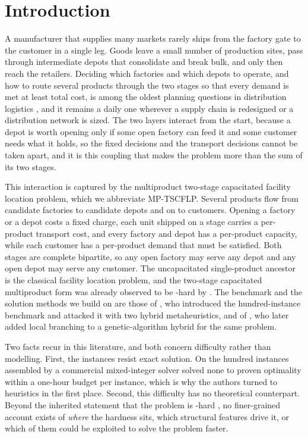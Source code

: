 \section{Introduction}\label{sec:intro}

A manufacturer that supplies many markets rarely ships from the factory
gate to the customer in a single leg. Goods leave a small number of
production sites, pass through intermediate depots that consolidate and
break bulk, and only then reach the retailers. Deciding which factories
and which depots to operate, and how to route several products through
the two stages so that every demand is met at least total cost, is among
the oldest planning questions in distribution logistics
\citep{KloseDrexl2005,OrtizAstorquizaEtAl2018}, and it remains
a daily one wherever a supply chain is redesigned or a distribution
network is sized. The two layers interact from the start, because a depot
is worth opening only if some open factory can feed it and some customer
needs what it holds, so the fixed decisions and the transport decisions
cannot be taken apart, and it is this coupling that makes the problem more
than the sum of its two stages.

This interaction is captured by the multiproduct two-stage capacitated
facility location problem, which we abbreviate MP-TSCFLP. Several
products flow from candidate factories to candidate depots and on to
customers. Opening a factory or a depot costs a fixed charge, each unit
shipped on a stage carries a per-product transport cost, and every
factory and depot has a per-product capacity, while each customer has a
per-product demand that must be satisfied. Both stages are complete
bipartite, so any open factory may serve any depot and any open depot may
serve any customer. The uncapacitated single-product ancestor is
the classical facility location problem, and the two-stage
capacitated multiproduct form was already observed to be \NP-hard by
\citet{PirkulJayaraman1998}. The benchmark and the solution methods we
build on are those of \citet{MauriEtAl2021}, who introduced the
hundred-instance benchmark and attacked it with two hybrid
metaheuristics, and of \citet{MoraisEtAl2022}, who later added local
branching to a genetic-algorithm hybrid for the same problem.

Two facts recur in this literature, and both concern difficulty rather
than modelling. First, the instances resist exact solution. On the
hundred instances assembled by \citet{MauriEtAl2021} a commercial
mixed-integer solver solved none to proven optimality within a one-hour
budget per instance, which is why the authors turned to heuristics in the first place.
Second, this difficulty has no theoretical counterpart. Beyond the
inherited statement that the problem is \NP-hard
\citep{PirkulJayaraman1998}, no finer-grained account exists of \emph{where}
the hardness sits, which structural features drive it, or which of them could
be exploited to solve the problem faster.

